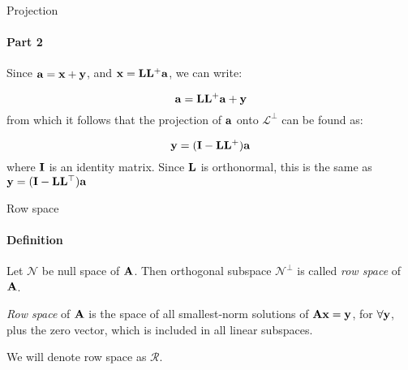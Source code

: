 \documentclass{beamer}
\begin{document}
\begin{frame}{Projection}
\framesubtitle{Part 2}
\begin{flushleft}

Since $\mathbf{a} = \mathbf{x} + \mathbf{y}$, and $\mathbf{x} = \mathbf{L} \mathbf{L}^+ \mathbf{a}$, we can write:

\begin{equation}
    \mathbf{a} = \mathbf{L} \mathbf{L}^+ \mathbf{a} + \mathbf{y}
\end{equation}
%
from which it follows that the projection of $\mathbf{a}$ onto $\mathcal{L}^\perp$ can be found as: 

\begin{equation}
    \mathbf{y} = (\mathbf{I} - \mathbf{L} \mathbf{L}^+) \mathbf{a}
\end{equation}
%
where $\mathbf{I}$ is an identity matrix. Since $\mathbf{L}$ is orthonormal, this is the same as $\mathbf{y} = (\mathbf{I} - \mathbf{L} \mathbf{L}^\top) \mathbf{a}$

\end{flushleft}
\end{frame}




\begin{frame}{Row space}
\framesubtitle{Definition}
\begin{flushleft}

\begin{definition}
Let $\mathcal{N}$ be null space of $\mathbf{A}$. Then orthogonal subspace $\mathcal{N}^\perp$ is called \emph{row space} of $\mathbf{A}$.
\end{definition}

\begin{definition}
\emph{Row space} of $\mathbf{A}$ is the space of all smallest-norm solutions of $\mathbf{A}\mathbf{x} = \mathbf{y}$, for $\forall \mathbf{y}$, plus the zero vector, which is included in all linear subspaces.
\end{definition}

\bigskip

We will denote row space as $\mathcal{R}$.

\end{flushleft}
\end{frame}
\end{document}
